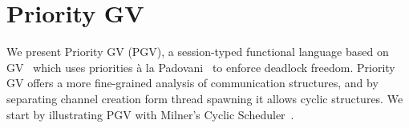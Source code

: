 \documentclass[main.tex]{subfiles}
\begin{document}
\section{Priority GV}\label{sec:pgv}

We present Priority GV (PGV), a session-typed functional language based on GV~\cite{wadler15,lindleymorris15} which uses priorities \`{a} la Padovani~\cite{kobayashi06,padovaninovara15} to enforce deadlock freedom.
Priority GV offers a more fine-grained analysis of communication structures, and by separating channel creation form thread spawning it allows cyclic structures. We start by illustrating PGV with Milner's Cyclic Scheduler~\cite{milner89}.



\end{document}
